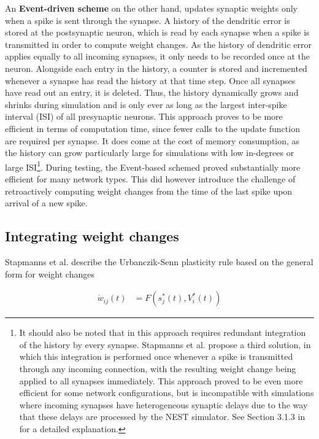 An \textbf{Event-driven scheme} on the other hand, updates synaptic weights only when a spike is sent through the
synapse. A history of the dendritic error is stored at the postsynaptic neuron, which is read by each synapse when a
spike is transmitted in order to compute weight changes. As the history of dendritic error applies equally to all
incoming synapses, it only needs to be recorded once at the neuron. Alongside each entry in the history, a counter is
stored and incremented whenever a synapse has read the history at that time step. Once all synapses have read out an
entry, it is deleted. Thus, the history dynamically grows and shrinks during simulation and is only ever as long as the
largest inter-spike interval (ISI) of all presynaptic neurons. This approach proves to be more efficient in terms of
computation time, since fewer calls to the update function are required per synapse. It does come at the cost of memory
consumption, as the history can grow particularly large for simulations with low in-degrees or large ISI\footnote{It
should also be noted that in this approach requires redundant integration of the history by every synapse. Stapmanns et
al. propose a third solution, in which this integration is performed once whenever a spike is transmitted through any
incoming connection, with the resulting weight change being applied to all synapses immediately. This approach proved to
be even more efficient for some network configurations, but is incompatible with simulations where incoming synapses
have heterogeneous synaptic delays due to the way that these delays are processed by the NEST simulator. See Section
3.1.3 in \cite{Stapmanns2021} for a detailed explanation.}. During testing, the Event-based schemed proved substantially
more efficient for many network types. This did however introduce the challenge of retroactively computing weight
changes from the time of the last spike upon arrival of a new spike. \newline


\subsection{Integrating weight changes}


Stapmanns et al. describe the Urbanczik-Senn plasticity rule based on the general form for weight changes

\begin{align}
  \dot{w}_{ij}(t) & = F(s_j^\ast (t), V_i^\ast (t)) \label{eq-delta-w-spiking}
\end{align}

